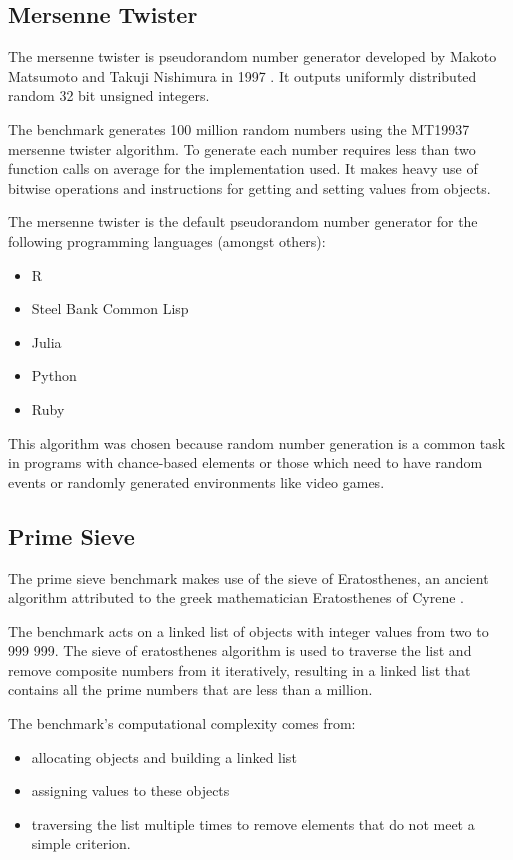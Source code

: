 \documentclass[english,a4paper,12pt]{report}
\begin{document}
\subsection{Mersenne Twister}
The mersenne twister is pseudorandom number generator developed by
Makoto Matsumoto and Takuji Nishimura in 1997 \cite{Matsumoto}. It
outputs uniformly distributed random 32 bit unsigned integers.

The benchmark generates 100 million random numbers using the MT19937
mersenne twister algorithm. To generate each number requires less than
two function calls on average for the implementation used. It makes
heavy use of bitwise operations and instructions for getting and
setting values from objects.

The mersenne twister is the default pseudorandom number generator for
the following programming languages (amongst others):
\begin{itemize}
	\item R \cite{R}
	\item Steel Bank Common Lisp \cite{SBCL}
	\item Julia \cite{Julia}
	\item Python \cite{Python}
	\item Ruby \cite{Ruby}
\end{itemize}

This algorithm was chosen because random number generation is a common
task in programs with chance-based elements or those which need to
have random events or randomly generated environments like video
games.

\subsection{Prime Sieve}

The prime sieve benchmark makes use of the sieve of Eratosthenes, an
ancient algorithm attributed to the greek mathematician Eratosthenes
of Cyrene \cite{sieve}.

The benchmark acts on a linked list of objects with integer values
from two to 999 999. The sieve of eratosthenes algorithm is used to
traverse the list and remove composite numbers from it iteratively,
resulting in a linked list that contains all the prime numbers that
are less than a million.

The benchmark's computational complexity comes from:
\begin{itemize}
\item allocating objects and building a linked list
\item assigning values to these objects
\item traversing the list multiple times to remove elements that do
  not meet a simple criterion.
\end{itemize}
\end{document}
